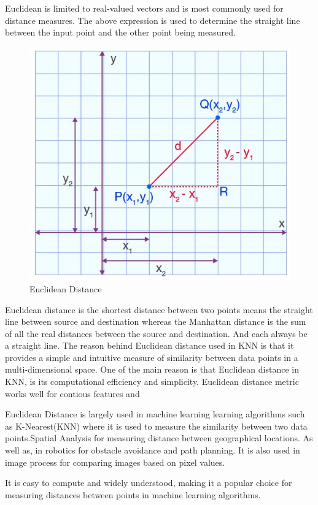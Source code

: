 \documentclass[conference]{IEEEtran}
\begin{document}
Euclidean is limited to real-valued vectors and is most commonly used for distance measures. The above expression is used to determine the straight line between the input point and the other point being measured. 


\begin{figure}
    \centering
    \includegraphics[width=0.7\linewidth]{EDistance.jpg}
    \caption{Euclidean Distance}
    \label{fig:enter-label}
\end{figure}


Euclidean distance is the shortest distance between two points means the straight line between source and destination whereas the Manhattan distance is the sum of all the real distances between the source and destination. And each always be a straight line. The reason behind Euclidean distance used in KNN is that it provides a simple and intuitive measure of similarity between data points in a multi-dimensional space. One of the main reason is that Euclidean distance in KNN, is its computational efficiency and simplicity. Euclidean distance metric works well for contious features and 



Euclidean Distance is largely used in machine learning learning algorithms such as K-Nearest(KNN) where it is used to measure the similarity between two data points.Spatial Analysis for measuring distance between geographical locations. As well as, in robotics for obstacle avoidance and path planning. It is also used in image process for comparing images based on pixel values. 




 It is easy to compute and widely understood, making it a popular choice for measuring distances between points in machine learning algorithms.
\end{document}
